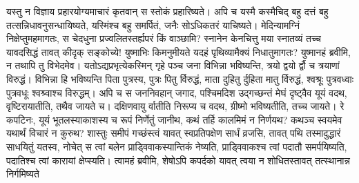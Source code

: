 \vakya यस्तु न विज्ञाय प्रहारयोग्यमाचारं कृतवान् स स्तोकं प्रहारिष्यते। अपि च यस्मै कस्मैचिद् बहु दत्तं बहु तत्सन्निधावनुसन्धायिष्यते, यस्मिंश्च बहु समर्पितं, जनैः सोऽधिकतरं याचिष्यते।
\vakya मेदिन्यामग्निं निक्षेप्तुमहमागतः, स चेदधुना प्रज्वलितस्तर्ह्यपरं किं वाञ्छामि?
\vakya स्नानेन केनचित्तु मया स्नातव्यं तच्च यावदसिद्धं तावत् कीदृक् सङ्कोच्ये!
\vakya युष्माभिः किमनुमीयते यदहं पृथिव्यामैक्यं निधातुमागतः? युष्मानहं ब्रवीमि, न तथापि तु विभेदमेव।
\vakya यतोऽद्यप्रभृत्येकस्मिन् गृहे पञ्च जना विभिन्ना भविष्यन्ति, त्रयो द्वयो र्द्वौ च त्रयाणां विरुद्धं।
\vakya विभिन्ना हि भविष्यन्ति पिता पुत्रस्य, पुत्रः पितु र्विरुद्धं, माता दुहितु र्दुहिता मातु र्विरुद्धं, श्वश्रूः पुत्रवध्वाः पुत्रवधूः श्वश्र्वाश्च विरुद्धम्।
\vakya अपि च स जननिवहान् जगाद, पश्चिमदिश उद्गच्छन्तं मेघं दृष्ट्वैव यूयं वदथ, वृष्टिरायातीति, तथैव जायते च।
\vakya दक्षिणवायु र्वातीति निरूप्य च वदथ, ग्रीष्मो भविष्यतीति, तच्च जायते।
\vakya रे कपटिनः, यूयं भूतलस्याकाशस्य च रूपं निर्णेतुं जानीथ, कथं तर्हि कालमिमं न निर्णयथ?
\vakya कथञ्च स्वयमेव यथार्थं विचारं न कुरुथ?
\vakya शास्तुः समीपं गच्छंस्त्वं यावत् स्वप्रतिपक्षेण सार्धं व्रजसि, तावत् पथि तस्मादुद्धारं साधयितुं यतस्व, नोचेत् स त्वां बलेन प्राड्विवाकस्यान्तिकं नेष्यति, प्राड्विवाकश्च त्वां पदातौ समर्पयिष्यति, पदातिश्च त्वां कारायां क्षेप्स्यति।
\vakya त्वामहं ब्रवीमि, शेषोऽपि कपर्दको यावत् त्वया न शोधितस्तावत् तत्स्थानान्न निर्गमिष्यते\eoc